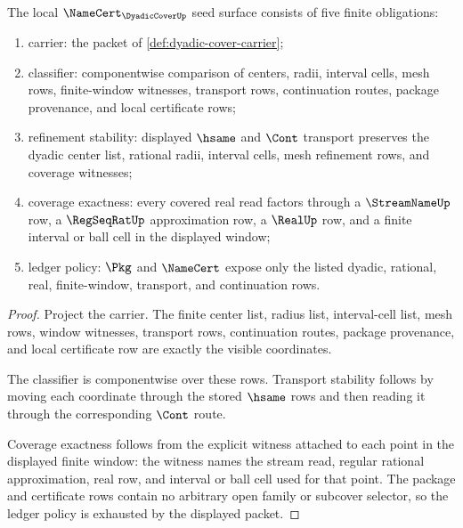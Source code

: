\begin{theorem}
\label{thm:dyadic-cover-namecert-obligations}
The local $\NameCert_{\DyadicCoverUp}$ seed surface consists of five finite
obligations:
\begin{enumerate}
\item carrier: the packet of \autoref{def:dyadic-cover-carrier};
\item classifier: componentwise comparison of centers, radii, interval cells,
mesh rows, finite-window witnesses, transport rows, continuation routes,
package provenance, and local certificate rows;
\item refinement stability: displayed $\hsame$ and $\Cont$ transport preserves
the dyadic center list, rational radii, interval cells, mesh refinement rows,
and coverage witnesses;
\item coverage exactness: every covered real read factors through a
$\StreamNameUp$ row, a $\RegSeqRatUp$ approximation row, a $\RealUp$ row, and a
finite interval or ball cell in the displayed window;
\item ledger policy: $\Pkg$ and $\NameCert$ expose only the listed dyadic,
rational, real, finite-window, transport, and continuation rows.
\end{enumerate}
\end{theorem}
\begin{proof}
Project the carrier. The finite center list, radius list, interval-cell list,
mesh rows, window witnesses, transport rows, continuation routes, package
provenance, and local certificate row are exactly the visible coordinates.

The classifier is componentwise over these rows. Transport stability follows
by moving each coordinate through the stored $\hsame$ rows and then reading it
through the corresponding $\Cont$ route.

Coverage exactness follows from the explicit witness attached to each point in
the displayed finite window: the witness names the stream read, regular
rational approximation, real row, and interval or ball cell used for that
point. The package and certificate rows contain no arbitrary open family or
subcover selector, so the ledger policy is exhausted by the displayed packet.
\end{proof}


